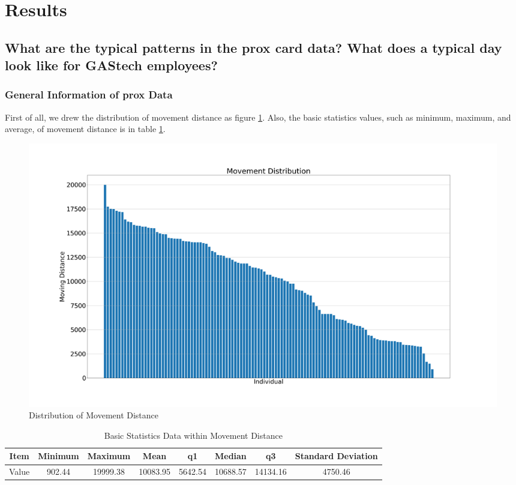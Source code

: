 \documentclass[aps, 10pt, a4paper]{article}
\begin{document}
    \section{Results}
        \subsection[Question 1]{What are the typical patterns in the prox card data? What does a typical day look like for GAStech employees?}
            \label{sec:question1}
            \subsubsection{General Information of prox Data}
                First of all, we drew the distribution of movement distance as figure \ref{fig:movementdist}. Also, the basic statistics values, such as minimum, maximum, and average, of movement distance is in table \ref{tb:movementdist}.
            
                \begin{figure}[htbp]
                    \centering
                    \includegraphics[width=0.6 \linewidth]{figures/movementdistribution.png}
                    \caption{Distribution of Movement Distance}
                    \label{fig:movementdist}
                \end{figure}
        
                \begin{table}[htbp]
                    \centering
                    \caption{Basic Statistics Data within Movement Distance}
                    \label{tb:movementdist}
                    \begin{tabular}{c||c|c|c|c|c|c|c}
                        Item & Minimum & Maximum & Mean & q1 & Median & q3 & Standard Deviation \\ \hline
                        Value & 902.44 & 19999.38 & 10083.95 & 5642.54 & 10688.57 & 14134.16 & 4750.46 \\
                    \end{tabular}
                \end{table}
            
\end{document}
